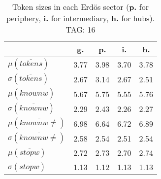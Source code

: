 \begin{table}[h!]
\begin{center}
\begin{tabular}{| l || c | c | c | c |}\hline
 & {\bf g.} & {\bf p.} & {\bf i.} & {\bf h.} \\\hline\hline
$\mu(\overline{tokens})$ & 3.77  & 3.98  & 3.70  & 3.78 \\
$\sigma(\overline{tokens})$ & 2.67  & 3.14  & 2.67  & 2.51 \\\hline
$\mu(\overline{knownw})$ & 5.67  & 5.75  & 5.55  & 5.76 \\
$\sigma(\overline{knownw})$ & 2.29  & 2.43  & 2.26  & 2.27 \\\hline
$\mu(\overline{knownw \neq})$ & 6.98  & 6.64  & 6.72  & 6.89 \\
$\sigma(\overline{knownw \neq})$ & 2.58  & 2.54  & 2.51  & 2.54 \\\hline
$\mu(\overline{stopw})$ & 2.72  & 2.73  & 2.70  & 2.74 \\
$\sigma(\overline{stopw})$ & 1.13  & 1.12  & 1.13  & 1.13 \\\hline
\end{tabular}
\caption{Token sizes in each Erd\"os sector ({{\bf p.}} for periphery, {{\bf i.}} for intermediary, {{\bf h.}} for hubs). TAG: 16}
\end{center}
\end{table}